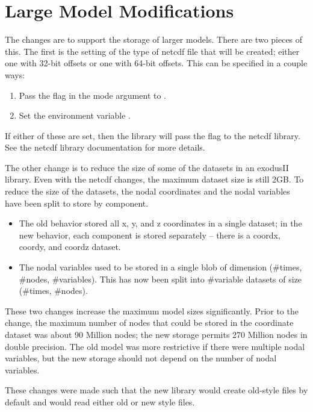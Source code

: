 \chapter{Large Model Modifications}\label{app:largemodel}

The changes are to support the storage of larger models. There are two
pieces of this. The first is the setting of the type of netcdf file
that will be created; either one with 32-bit offsets or one with
64-bit offsets. This can be specified in a couple ways:
\begin{enumerate}
\item Pass the  flag in the mode argument to .
\item Set the environment variable .
\end{enumerate}

If either of these are set, then the library will pass the
 flag to the netcdf library. See the netcdf library
documentation for more details.

The other change is to reduce the size of some of the datasets in an
exodusII library. Even with the netcdf changes, the maximum dataset
size is still 2GB. To reduce the size of the datasets, the nodal
coordinates and the nodal variables have been split to store by
component.
\begin{itemize}
\item The old behavior stored all x, y, and z coordinates in a single
dataset; in the new behavior, each component is stored separately --
there is a coordx, coordy, and coordz dataset.

\item The nodal variables used to be stored in a single blob of dimension
(\#times, \#nodes, \#variables). This has now been split into
\#variable datasets of size (\#times, \#nodes).
\end{itemize}
These two changes increase the maximum model sizes
significantly. Prior to the change, the maximum number of nodes that
could be stored in the coordinate dataset was about 90 Million nodes;
the new storage permits 270 Million nodes in double precision. The old
model was more restrictive if there were multiple nodal variables, but
the new storage should not depend on the number of nodal variables.

These changes were made such that the new library would create
old-style files by default and would read either old or new style
files.

